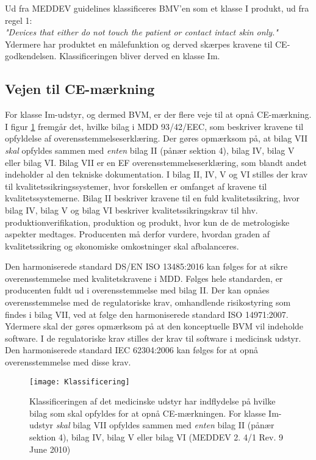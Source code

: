 Ud fra MEDDEV guidelines klassificeres BMV'en som et klasse I produkt, ud fra regel 1: \\
\textit{"Devices that either do not touch the patient or contact intact skin only."} \\
Ydermere har produktet en målefunktion og derved skærpes kravene til CE-godkendelsen. Klassificeringen bliver derved en klasse Im.

\subsection{Vejen til CE-mærkning}

For klasse Im-udstyr, og dermed BVM, er der flere veje til at opnå CE-mærkning. I figur \ref{fig:Klas} fremgår det, hvilke bilag i MDD 93/42/EEC, som beskriver kravene til opfyldelse af overensstemmelseserklæring. Der gøres opmærksom på, at bilag VII \textit{skal} opfyldes sammen med \textit{enten} bilag II (pånær sektion 4), bilag IV, bilag V eller bilag VI. Bilag VII er en EF overensstemmelseserklæring, som blandt andet indeholder al den tekniske dokumentation. I bilag II, IV, V og VI stilles der krav til kvalitetssikringssystemer, hvor forskellen er omfanget af kravene til kvalitetssystemerne. Bilag II beskriver kravene til en fuld kvalitetssikring, hvor bilag IV, bilag V og bilag VI beskriver kvalitetssikringskrav til hhv. produktionverifikation, produktion og produkt, hvor kun de de metrologiske aspekter medtages. Producenten må derfor vurdere, hvordan graden af kvalitetssikring og økonomiske omkostninger skal afbalanceres.   

    Den harmoniserede standard DS/EN ISO 13485:2016 kan følges for at sikre overensstemmelse med kvalitetskravene i MDD. Følges hele standarden, er producenten fuldt ud i overensstemmelse med bilag II.
    Der kan opnåes overensstemmelse med de regulatoriske krav, omhandlende risikostyring som findes i bilag VII, ved at følge den harmoniserede standard ISO 14971:2007.
Ydermere skal der gøres opmærksom på at den konceptuelle BVM vil indeholde software. I de regulatoriske krav stilles der krav til software i medicinsk udstyr. Den harmoniserede standard IEC 62304:2006 kan følges for at opnå overensstemmelse med disse krav.   


\begin{figure}[htb]
\centering
\texttt{[image: Klassificering]}
\caption{Klassificeringen af det medicinske udstyr har indflydelse på hvilke bilag som skal opfyldes for at opnå CE-mærkningen. For klasse Im-udstyr \textit{skal} bilag VII opfyldes sammen med \textit{enten} bilag II (pånær sektion 4), bilag IV, bilag V eller bilag VI (MEDDEV 2. 4/1 Rev. 9 June 2010)}
\label{fig:Klas}
\end{figure}

